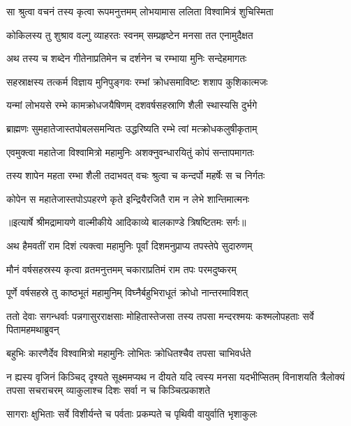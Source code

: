 \twolineshloka
{सा श्रुत्वा वचनं तस्य कृत्वा रूपमनुत्तमम्}
{लोभयामास ललिता विश्वामित्रं शुचिस्मिता} %

\twolineshloka
{कोकिलस्य तु शुश्राव वल्गु व्याहरतः स्वनम्}
{सम्प्रहृष्टेन मनसा तत एनामुदैक्षत} %

\twolineshloka
{अथ तस्य च शब्देन गीतेनाप्रतिमेन च}
{दर्शनेन च रम्भाया मुनिः सन्देहमागतः} %

\twolineshloka
{सहस्राक्षस्य तत्कर्म विज्ञाय मुनिपुङ्गवः}
{रम्भां क्रोधसमाविष्टः शशाप कुशिकात्मजः} %

\twolineshloka
{यन्मां लोभयसे रम्भे कामक्रोधजयैषिणम्}
{दशवर्षसहस्राणि शैली स्थास्यसि दुर्भगे} %

\twolineshloka
{ब्राह्मणः सुमहातेजास्तपोबलसमन्वितः}
{उद्धरिष्यति रम्भे त्वां मत्क्रोधकलुषीकृताम्} %

\twolineshloka
{एवमुक्त्वा महातेजा विश्वामित्रो महामुनिः}
{अशक्नुवन्धारयितुं कोपं सन्तापमागतः} %

\twolineshloka
{तस्य शापेन महता रम्भा शैली तदाभवत्}
{वचः श्रुत्वा च कन्दर्पो महर्षेः स च निर्गतः} %

\twolineshloka
{कोपेन स महातेजास्तपोऽपहरणे कृते}
{इन्द्रियैरजितै राम न लेभे शान्तिमात्मनः} %


{॥इत्यार्षे श्रीमद्रामायणे वाल्मीकीये आदिकाव्ये बालकाण्डे त्रिषष्टितमः सर्गः॥}


\twolineshloka
{अथ हैमवतीं राम दिशं त्यक्त्वा महामुनिः}
{पूर्वां दिशमनुप्राप्य तपस्तेपे सुदारुणम्} %

\twolineshloka
{मौनं वर्षसहस्रस्य कृत्वा व्रतमनुत्तमम्}
{चकाराप्रतिमं राम तपः परमदुष्करम्} %

\twolineshloka
{पूर्णे वर्षसहस्रे तु काष्ठभूतं महामुनिम्}
{विघ्नैर्बहुभिराधूतं क्रोधो नान्तरमाविशत्} %

\threelineshloka
{ततो देवाः सगन्धर्वाः पन्नगासुरराक्षसाः}
{मोहितास्तेजसा तस्य तपसा मन्दरश्मयः}
{कश्मलोपहताः सर्वे पितामहमथाब्रुवन्} %

\twolineshloka
{बहुभिः कारणैर्देव विश्वामित्रो महामुनिः}
{लोभितः क्रोधितश्चैव तपसा चाभिवर्धते} %

\fourlineshloka
{न ह्यस्य वृजिनं किञ्चिद् दृश्यते सूक्ष्ममप्यथ}
{न दीयते यदि त्वस्य मनसा यदभीप्सितम्}
{विनाशयति त्रैलोक्यं तपसा सचराचरम्}
{व्याकुलाश्च दिशः सर्वा न च किञ्चित्प्रकाशते} %

\twolineshloka
{सागराः क्षुभिताः सर्वे विशीर्यन्ते च पर्वताः}
{प्रकम्पते च पृथिवी वायुर्वाति भृशाकुलः} %


